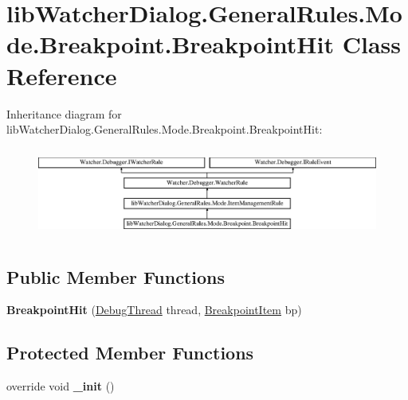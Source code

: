 \hypertarget{classlib_watcher_dialog_1_1_general_rules_1_1_mode_1_1_breakpoint_1_1_breakpoint_hit}{\section{lib\+Watcher\+Dialog.\+General\+Rules.\+Mode.\+Breakpoint.\+Breakpoint\+Hit Class Reference}
\label{classlib_watcher_dialog_1_1_general_rules_1_1_mode_1_1_breakpoint_1_1_breakpoint_hit}
}
Inheritance diagram for lib\+Watcher\+Dialog.\+General\+Rules.\+Mode.\+Breakpoint.\+Breakpoint\+Hit\+:\begin{figure}[H]
\begin{center}
\leavevmode
\includegraphics[height=2.986667cm]{classlib_watcher_dialog_1_1_general_rules_1_1_mode_1_1_breakpoint_1_1_breakpoint_hit}
\end{center}
\end{figure}
\subsection*{Public Member Functions}
\begin{DoxyCompactItemize}
\item 
\hypertarget{classlib_watcher_dialog_1_1_general_rules_1_1_mode_1_1_breakpoint_1_1_breakpoint_hit_a80b12d092c25e77e74a06d12915394e1}{{\bfseries Breakpoint\+Hit} (\hyperlink{classlib_wather_debugger_1_1_thread_1_1_debug_thread}{Debug\+Thread} thread, \hyperlink{classlib_watcher_dialog_1_1_property_item_1_1_break_point_1_1_breakpoint_item}{Breakpoint\+Item} bp)}\label{classlib_watcher_dialog_1_1_general_rules_1_1_mode_1_1_breakpoint_1_1_breakpoint_hit_a80b12d092c25e77e74a06d12915394e1}

\end{DoxyCompactItemize}
\subsection*{Protected Member Functions}
\begin{DoxyCompactItemize}
\item 
\hypertarget{classlib_watcher_dialog_1_1_general_rules_1_1_mode_1_1_breakpoint_1_1_breakpoint_hit_a10f79f2a17df6e8ed72a918e2a63f6b4}{override void {\bfseries \+\_\+init} ()}\label{classlib_watcher_dialog_1_1_general_rules_1_1_mode_1_1_breakpoint_1_1_breakpoint_hit_a10f79f2a17df6e8ed72a918e2a63f6b4}

\end{DoxyCompactItemize}
